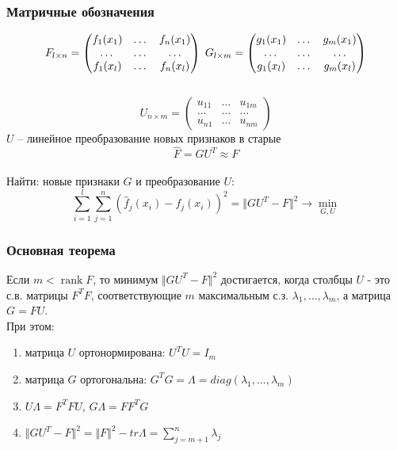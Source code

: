 \documentclass[12pt]{beamer}
\DeclareMathOperator{\rank}{rank}
\begin{document}
\begin{frame}\frametitle{Матричные обозначения}
$$F_{l \times n} = \begin{pmatrix}
  f_1(x_1) & \dots & f_n(x_1) \\
  \dots & \dots & \dots\\
  f_1(x_l) & \dots & f_n(x_l)
 \end{pmatrix} \hspace{1mm} G_{l \times m} = \begin{pmatrix}
  g_1(x_1) & \dots & g_m(x_1) \\
  \dots & \dots & \dots\\
  g_1(x_l) & \dots & g_m(x_l)
 \end{pmatrix}$$\\
 $$U_{n \times m} = \begin{pmatrix}
  u_{11} & \dots & u_{1m} \\
  \dots & \dots & \dots\\
  u_{n1} & \dots & u_{nm}
 \end{pmatrix}$$
$U$ -- линейное преобразование новых признаков в старые\\
$$\hat{F} = GU^T \approx F$$\\
Найти: новые признаки $G$ и преобразование $U$:\\
$$\sum\limits_{i=1}^l \sum\limits_{j=1}^n (\hat{f}_j(x_i) - f_j(x_i))^2 = \Vert GU^T - F \Vert^2 \rightarrow \min\limits_{G, U}$$
\end{frame}

\begin{frame}\frametitle{Основная теорема}
Если $m < \rank F$, то минимум $\Vert GU^T - F \Vert^2$ достигается, когда столбцы $U$ - это с.в. матрицы $F^TF$, соответствующие $m$ максимальным с.з. $\lambda_1,\dots, \lambda_m$, а матрица $G = FU$.\\
\vspace{5mm}
При этом:\\
\begin{enumerate}[--]
\item матрица $U$ ортонормирована: $U^TU = I_m$
\item матрица $G$ ортогональна: $G^TG = \Lambda = diag(\lambda_1, \dots, \lambda_m)$
\item $U\Lambda = F^TFU$,  $G\Lambda = FF^TG$
\item $\Vert GU^T - F \Vert^2 = \Vert F \Vert^2 - tr \Lambda = \sum\limits_{j=m+1}^n \lambda_j$
\end{enumerate}

\end{frame}
\end{document}
